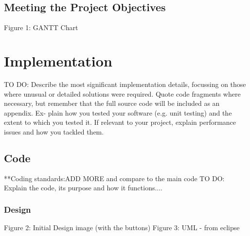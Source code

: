 \documentclass{article}[11pt,Tahoma]
\begin{document}
		 \subsection{Meeting the Project Objectives} 
		 	Figure 1: GANTT Chart

	\section{Implementation}
		TO DO: Describe the most significant implementation details, focussing on those where unusual or detailed solutions were required. Quote code fragments where necessary, but remember that the full source code will be included as an appendix. Ex- plain how you tested your software (e.g. unit testing) and the extent to which you tested it. If relevant to your project, explain performance issues and how you tackled them.
		\subsection{Code}
			**Coding standards:ADD MORE and compare to the main code
			TO DO: Explain the code, its purpose and how it functions....
		\subsubsection{Design}
			 	Figure 2: Initial Design image (with the buttons)
				Figure 3: UML - from eclipse
\end{document}
